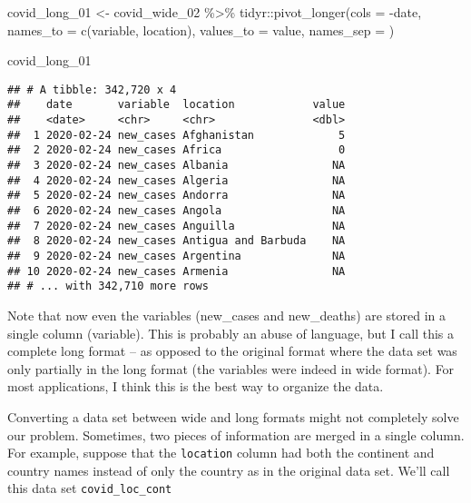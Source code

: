 \documentclass[
]{book}
\newenvironment{Shaded}{\begin{snugshade}}{\end{snugshade}}
\newcommand{\AttributeTok}[1]{\textcolor[rgb]{0.77,0.63,0.00}{#1}}
\newcommand{\FunctionTok}[1]{\textcolor[rgb]{0.00,0.00,0.00}{#1}}
\newcommand{\NormalTok}[1]{#1}
\newcommand{\OtherTok}[1]{\textcolor[rgb]{0.56,0.35,0.01}{#1}}
\newcommand{\SpecialCharTok}[1]{\textcolor[rgb]{0.00,0.00,0.00}{#1}}
\newcommand{\StringTok}[1]{\textcolor[rgb]{0.31,0.60,0.02}{#1}}
\begin{document}
\begin{Shaded}
\begin{Highlighting}[]
\NormalTok{covid\_long\_01 }\OtherTok{\textless{}{-}}\NormalTok{ covid\_wide\_02 }\SpecialCharTok{\%\textgreater{}\%} 
\NormalTok{  tidyr}\SpecialCharTok{::}\FunctionTok{pivot\_longer}\NormalTok{(}\AttributeTok{cols      =} \SpecialCharTok{{-}}\StringTok{\textquotesingle{}date\textquotesingle{}}\NormalTok{,}
                      \AttributeTok{names\_to  =} \FunctionTok{c}\NormalTok{(}\StringTok{\textquotesingle{}variable\textquotesingle{}}\NormalTok{, }\StringTok{\textquotesingle{}location\textquotesingle{}}\NormalTok{),}
                      \AttributeTok{values\_to =} \StringTok{\textquotesingle{}value\textquotesingle{}}\NormalTok{,}
                      \AttributeTok{names\_sep =} \StringTok{\textquotesingle{}{-}\textquotesingle{}}\NormalTok{)}

\NormalTok{covid\_long\_01}
\end{Highlighting}
\end{Shaded}

\begin{verbatim}
## # A tibble: 342,720 x 4
##    date       variable  location            value
##    <date>     <chr>     <chr>               <dbl>
##  1 2020-02-24 new_cases Afghanistan             5
##  2 2020-02-24 new_cases Africa                  0
##  3 2020-02-24 new_cases Albania                NA
##  4 2020-02-24 new_cases Algeria                NA
##  5 2020-02-24 new_cases Andorra                NA
##  6 2020-02-24 new_cases Angola                 NA
##  7 2020-02-24 new_cases Anguilla               NA
##  8 2020-02-24 new_cases Antigua and Barbuda    NA
##  9 2020-02-24 new_cases Argentina              NA
## 10 2020-02-24 new_cases Armenia                NA
## # ... with 342,710 more rows
\end{verbatim}

Note that now even the variables (new\_cases and new\_deaths) are stored in a single column (variable). This is probably an abuse of language, but I call this a complete long format -- as opposed to the original format where the data set was only partially in the long format (the variables were indeed in wide format). For most applications, I think this is the best way to organize the data.

Converting a data set between wide and long formats might not completely solve our problem. Sometimes, two pieces of information are merged in a single column. For example, suppose that the \texttt{location} column had both the continent and country names instead of only the country as in the original data set. We'll call this data set \texttt{covid\_loc\_cont}
\end{document}

